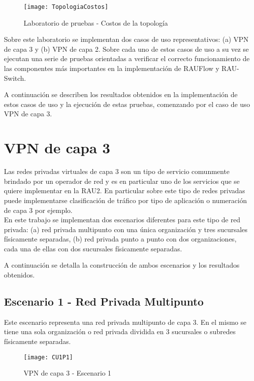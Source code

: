 \begin{figure}[ht!] 
\centering    
\texttt{[image: TopologiaCostos]}
\caption[Laboratorio de pruebas - Costos de la topolog\'ia]{Laboratorio de pruebas - Costos de la topolog\'ia}
\label{fig:LaboratorioDePruebasCostos}
\end{figure}

Sobre este laboratorio se implementan dos casos de uso representativos: (a) VPN de capa 3 y (b) VPN de capa 2. Sobre cada uno de estos casos de uso a su vez se ejecutan una serie de pruebas orientadas a verificar el correcto funcionamiento de las componentes m\'as importantes en la implementaci\'on de RAUFlow y RAU-Switch.

A continuaci\'on se describen los resultados obtenidos en la implementaci\'on de estos casos de uso y la ejecuci\'on de estas pruebas, comenzando por el caso de uso VPN de capa 3.

\section{VPN de capa 3}

Las redes privadas virtuales de capa 3 son un tipo de servicio comunmente brindado por un operador de red y es en particular uno de los servicios que se quiere implementar en la RAU2. En particular sobre este tipo de redes privadas puede implementarse clasificaci\'on de tr\'afico por tipo de aplicaci\'on o numeraci\'on de capa 3 por ejemplo.\\

En este trabajo se implementan dos escenarios diferentes para este tipo de red privada: (a) red privada multipunto con una \'unica organizaci\'on y tres sucursales f\'isicamente separadas, (b) red privada punto a punto con dos organizaciones, cada una de ellas con dos sucursales f\'isicamente separadas.

A continuaci\'on se detalla la construcci\'on de ambos escenarios y los resultados obtenidos.

\subsection{Escenario 1 - Red Privada Multipunto}

Este escenario representa una red privada multipunto de capa 3. En el mismo se tiene una sola organizaci\'on o red privada dividida en 3 sucursales o subredes físicamente separadas.

\begin{figure}[ht!] 
\centering    
\texttt{[image: CU1P1]}
\caption[VPN de capa 3 - Escenario 1]{VPN de capa 3 - Escenario 1}
\label{fig:CUP1}
\end{figure}

